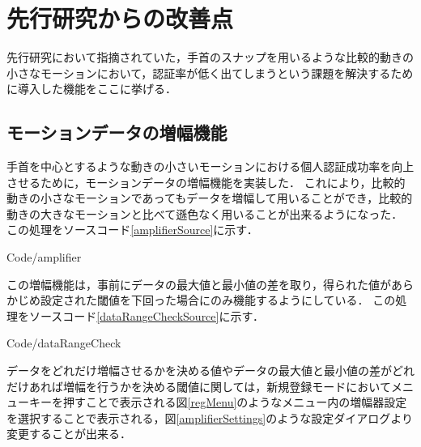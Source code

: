\documentclass[11pt]{jreport}
\renewcommand{\slash}{/}
\begin{document}
    \section{先行研究からの改善点}
    先行研究において指摘されていた，手首のスナップを用いるような比較的動きの小さなモーションにおいて，認証率が低く出てしまうという課題を解決するために導入した機能をここに挙げる．

        \subsection{モーションデータの増幅機能}
        手首を中心とするような動きの小さいモーションにおける個人認証成功率を向上させるために，モーションデータの増幅機能を実装した．
        これにより，比較的動きの小さなモーションであってもデータを増幅して用いることができ，比較的動きの大きなモーションと比べて遜色なく用いることが出来るようになった．
        この処理をソースコード\ref{amplifierSource}に示す．

\newpage
        
        {Code\slash amplifier}

        この増幅機能は，事前にデータの最大値と最小値の差を取り，得られた値があらかじめ設定された閾値を下回った場合にのみ機能するようにしている．
        この処理をソースコード\ref{dataRangeCheckSource}に示す．

\newpage
        
        {Code\slash dataRangeCheck}

        データをどれだけ増幅させるかを決める値やデータの最大値と最小値の差がどれだけあれば増幅を行うかを決める閾値に関しては，新規登録モードにおいてメニューキーを押すことで表示される図\ref{regMenu}のようなメニュー内の増幅器設定を選択することで表示される，図\ref{amplifierSettings}のような設定ダイアログより変更することが出来る．
\end{document}
